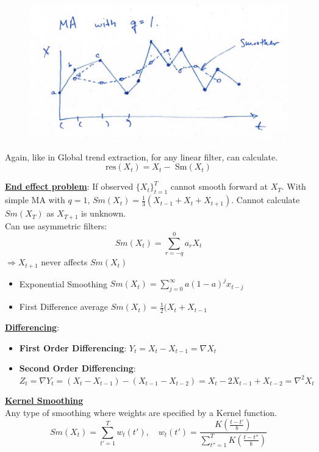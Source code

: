 \begin{figure}[H]
\includegraphics[scale=0.3]{images/Screenshot 2024-03-30 at 14.22.35.jpg}
\centering
\end{figure}


Again, like in Global trend extraction, for any linear filter, can calculate.
\[
\boxed{\text{res}(X_t)=X_t-\text{ Sm}(X_t)}
\]

\textbf{\underline{End effect problem}}: If observed $ \{X_t\}_{t=1}^T $ cannot smooth forward at $X_T$. With simple MA with $q=1$, $Sm(X_t)=\frac{1}{3}(X_{t-1}+X_t+X_{t+1})$. Cannot calculate $Sm(X_T)$ as $X_{T+1}$ is unknown. \\

Can use asymmetric filters:
\[Sm(X_t)=\sum_{r=-q}^0 a_r X_t\]
$\Rightarrow X_{t+1}$ never affects $Sm(X_t)$
\begin{itemize}
    \item Exponential Smoothing $Sm(X_t)=\sum_{j=0}^\infty a(1-a)^j x_{t-j}$
    \item First Difference average $Sm(X_t)=\frac{1}{2}(X_t+X_{t-1}$
\end{itemize}


\textbf{\underline{Differencing}}:
\begin{itemize}
    \item \textbf{First Order Differencing}: $Y_t =X_t-X_{t-1} = \nabla X_t$
    \item \textbf{Second Order Differencing}: $Z_t=\nabla Y_t= (X_t-X_{t-1})-(X_{t-1}-X_{t-2})=X_t-2X_{t-1}+X_{t-2}=\nabla^2X_t$
\end{itemize}

\textbf{\underline{Kernel Smoothing}}\\

Any type of smoothing where weights are specified by a Kernel function. 
\[Sm(X_t)=\sum_{t'=1}^T w_t(t'), \quad w_t(t')= \frac{K\left(\frac{t-t'}{b} \right)}{\sum_{t''=1}^T K\left( \frac{t-t''}{b}\right)}\]

